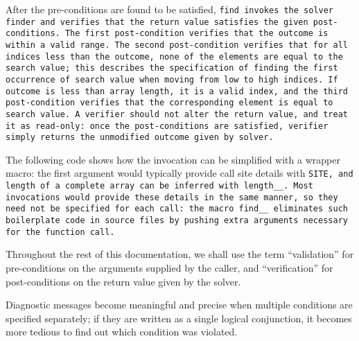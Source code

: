 After the pre-conditions are found to be satisfied, \tt{find} invokes the solver
\tt{finder} and verifies that the return value satisfies the given post-conditions.
The first post-condition verifies that the outcome is within a valid range.
The second post-condition verifies that for all indices less than
the outcome, none of the elements are equal to the search value;
this describes the specification of finding the first occurrence
of search value when moving from low to high indices.
If outcome is less than array length, it is a valid index, and the third
post-condition verifies that the corresponding element is equal to search value.
A verifier should not alter the return value, and treat
it as read-only: once the post-conditions are satisfied,
verifier simply returns the unmodified outcome given by solver.

The following code shows how the invocation can be simplified with a wrapper
macro: the first argument would typically provide call site details with
\tt{SITE}, and length of a complete array can be inferred with \tt{length__}.
Most invocations would provide these details in the same manner, so they need
not be specified for each call: the macro \tt{find__} eliminates such boilerplate
code in source files by pushing extra arguments necessary for the function call.


\note Throughout the rest of this documentation, we shall use the term
``validation'' for pre-conditions on the arguments supplied by the caller, and
``verification'' for post-conditions on the return value given by the solver.


Diagnostic messages become meaningful and precise
when multiple conditions are specified separately;
if they are written as a single logical conjunction,
it becomes more tedious to find out which condition was violated.
